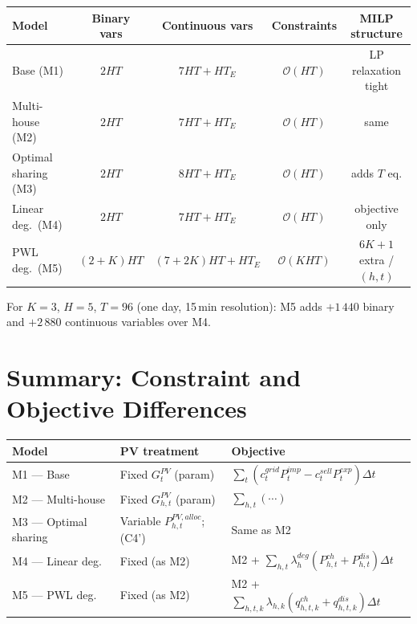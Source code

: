 \documentclass{article}
\begin{document}
\begin{center}
\renewcommand{\arraystretch}{1.3}
\begin{tabular}{lcccc}
\toprule
Model & Binary vars & Continuous vars & Constraints & MILP structure \\
\midrule
Base (M1)            & $2HT$         & $7HT + HT_E$   & $\mathcal{O}(HT)$    & LP relaxation tight \\
Multi-house (M2)     & $2HT$         & $7HT + HT_E$   & $\mathcal{O}(HT)$    & same \\
Optimal sharing (M3) & $2HT$         & $8HT + HT_E$   & $\mathcal{O}(HT)$    & adds $T$ eq. \\
Linear deg.\ (M4)    & $2HT$         & $7HT + HT_E$   & $\mathcal{O}(HT)$    & objective only \\
PWL deg.\ (M5)       & $(2+K)HT$     & $(7+2K)HT + HT_E$ & $\mathcal{O}(KHT)$ & $6K+1$ extra /$(h,t)$ \\
\bottomrule
\end{tabular}
\end{center}

For $K=3$, $H=5$, $T=96$ (one day, 15\,min resolution):
M5 adds $+1\,440$ binary and $+2\,880$ continuous variables over M4.

\newpage
\section{Summary: Constraint and Objective Differences}
\label{sec:summary}

\begin{center}
\renewcommand{\arraystretch}{1.4}
\begin{tabular}{lp{4.5cm}p{5.5cm}}
\toprule
Model & PV treatment & Objective \\
\midrule
M1 — Base                  & Fixed $G^{PV}_t$ (param)          & $\sum_t (c^{grid}_t P^{imp}_t - c^{sell}_t P^{exp}_t)\Delta t$ \\
M2 — Multi-house           & Fixed $G^{PV}_{h,t}$ (param)       & $\sum_{h,t}(\cdots)$ \\
M3 — Optimal sharing       & Variable $P^{PV,alloc}_{h,t}$; (C4') & Same as M2 \\
M4 — Linear deg.           & Fixed (as M2)                      & M2 + $\sum_{h,t}\lambda^{deg}_h(P^{ch}_{h,t}+P^{dis}_{h,t})\Delta t$ \\
M5 — PWL deg.              & Fixed (as M2)                      & M2 + $\sum_{h,t,k}\lambda_{h,k}(q^{ch}_{h,t,k}+q^{dis}_{h,t,k})\Delta t$ \\
\bottomrule
\end{tabular}
\end{center}
\end{document}
